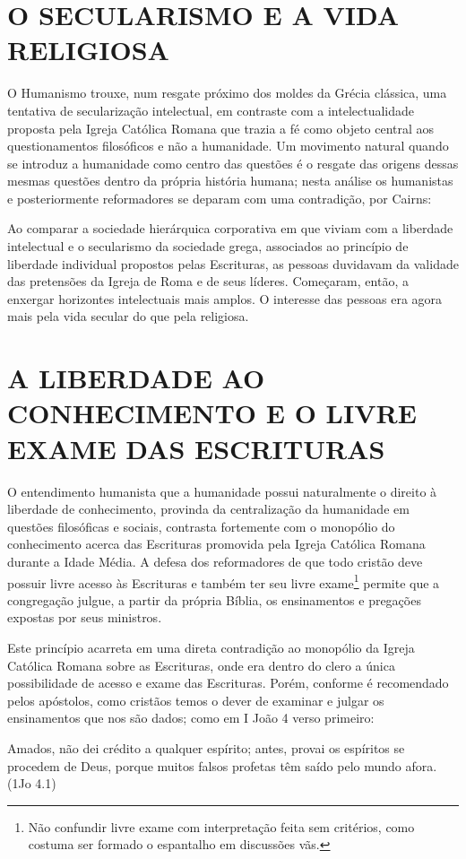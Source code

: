 \documentclass[
    article,            %
	12pt,				%
	oneside,			%
	a4paper,			%
	english,			%
	french,				%
	spanish,			%
	brazil				%
	]{abntex2}
\begin{document}
\section{O SECULARISMO E A VIDA RELIGIOSA}
O Humanismo trouxe, num resgate próximo dos moldes da Grécia clássica, uma tentativa de secularização intelectual, em contraste com a intelectualidade proposta pela Igreja Católica Romana que trazia a fé como objeto central aos questionamentos filosóficos e não a humanidade. Um movimento natural quando se introduz a humanidade como centro das questões é o resgate das origens dessas mesmas questões dentro da própria história humana; nesta análise os humanistas e posteriormente reformadores se deparam com uma contradição, por Cairns:
\begin{citacao}
Ao comparar a sociedade hierárquica corporativa em que viviam com a liberdade intelectual e o secularismo da sociedade grega, associados ao princípio de liberdade individual propostos pelas Escrituras, as pessoas duvidavam da validade das pretensões da Igreja de Roma e de seus líderes. Começaram, então, a enxergar horizontes intelectuais mais amplos. O interesse das pessoas era agora mais pela vida secular do que pela religiosa. \cite[p. 254]{CAIRNS}
\end{citacao}

\pagebreak

\section{A LIBERDADE AO CONHECIMENTO E O LIVRE EXAME DAS ESCRITURAS}
O entendimento humanista que a humanidade possui naturalmente o direito à liberdade de conhecimento, provinda da centralização da humanidade em questões filosóficas e sociais, contrasta fortemente com o monopólio do conhecimento acerca das Escrituras promovida pela Igreja Católica Romana durante a Idade Média.  A defesa dos reformadores de que todo cristão deve possuir livre acesso às Escrituras e também ter seu livre exame\footnote{Não confundir livre exame com interpretação feita sem critérios, como costuma ser formado o espantalho em discussões vãs.} permite que a congregação julgue, a partir da própria Bíblia, os ensinamentos e pregações expostas por seus ministros.

Este princípio acarreta em uma direta contradição ao monopólio da Igreja Católica Romana sobre as Escrituras, onde era dentro do clero a única possibilidade de acesso e exame das Escrituras. Porém, conforme é recomendado pelos apóstolos, como cristãos temos o dever de examinar e julgar os ensinamentos que nos são dados; como em I João 4 verso primeiro:
\begin{citacao}
Amados, não dei crédito a qualquer espírito; antes, provai os espíritos se procedem de Deus, porque muitos falsos profetas têm saído pelo mundo afora. (1Jo 4.1)
\end{citacao}
\end{document}
